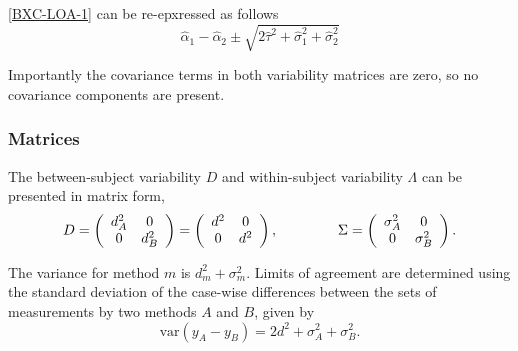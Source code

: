 \documentclass[12pt, a4paper]{report}
\theoremstyle{plain}
\theoremstyle{definition}
\theoremstyle{remark}
\begin{document}
\ref{BXC-LOA-1} can be re-epxressed as follows
\begin{equation}
	\hat{\alpha}_1 - \hat{\alpha}_2 \pm \sqrt{2 \hat{\tau}^2 + \hat{\sigma}^2_1 + \hat{\sigma}^2_2}
\end{equation}
	
	Importantly the covariance terms in both variability matrices are zero, so no covariance components are present. 

	

	\subsubsection*{Matrices}
	The between-subject variability ${D}$ and within-subject variability ${\Lambda}$ can be presented in matrix form,\[
	{D} = \left(%
	\begin{array}{cc}
	d^2_{A}& 0 \\
	0 & d^2_{B} \\
	\end{array}%
	\right)=\left(%
	\begin{array}{cc}
	d^2& 0 \\
	0 & d^2\\
	\end{array}%
	\right),
	\hspace{1.5cm}
	{\Sigma} = \left(%
	\begin{array}{cc}
	\sigma^2_{A}& 0 \\
	0 & \sigma^2_{B} \\
	\end{array}%
	\right).
	\]
	
	The variance for method $m$ is $d^2_{m}+\sigma^2_{m}$. Limits of agreement are determined using the standard deviation of the case-wise differences between the sets of measurements by two methods $A$ and $B$, given by
	\begin{equation}
		\mbox{var} (y_{A}-y_{B}) = 2d^2 + \sigma^2_{A}+ \sigma^2_{B}.
	\end{equation}

	
	
	
\end{document}
